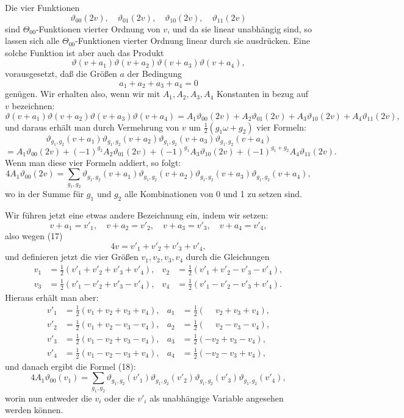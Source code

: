 \documentclass[11pt]{article}
\providecommand{\tht}{\vartheta}
\begin{document}
Die vier Funktionen
\begin{equation}
\tht_{00}(2v),\quad \tht_{01}(2v),\quad \tht_{10}(2v),\quad \tht_{11}(2v)
\tag{15}
\end{equation}
sind $\Theta_{00}$-Funktionen vierter Ordnung von $v$, und da sie linear unabhängig sind, so lassen sich alle $\Theta_{00}$-Funktionen vierter Ordnung linear durch sie ausdrücken. Eine solche Funktion ist aber auch das Produkt
\begin{equation}
\tht(v+a_1)\tht(v+a_2)\tht(v+a_3)\tht(v+a_4),
\tag{16}
\end{equation}
vorausgesetzt, daß die Größen $a$ der Bedingung
\begin{equation}
a_1+a_2+a_3+a_4=0
\tag{17}
\end{equation}
genügen. Wir erhalten also, wenn wir mit $A_1,A_2,A_3,A_4$ Konstanten in bezug auf $v$ bezeichnen:
\[
\tht(v+a_1)\tht(v+a_2)\tht(v+a_3)\tht(v+a_4)
=A_1\tht_{00}(2v)+A_2\tht_{01}(2v)+A_3\tht_{10}(2v)+A_4\tht_{11}(2v),
\]
und daraus erhält man durch Vermehrung von $v$ um $\frac12(g_1\omega+g_2)$ vier Formeln:
\[
\tht_{g_1,g_2}(v+a_1)\tht_{g_1,g_2}(v+a_2)\tht_{g_1,g_2}(v+a_3)\tht_{g_1,g_2}(v+a_4)
\]
\[
=A_1\tht_{00}(2v)+(-1)^{g_2}A_2\tht_{01}(2v)+(-1)^{g_1}A_3\tht_{10}(2v)+(-1)^{g_1+g_2}A_4\tht_{11}(2v).
\]
Wenn man diese vier Formeln addiert, so folgt:
\begin{equation}
4A_1\tht_{00}(2v)
=\sum_{g_1,g_2}\tht_{g_1,g_2}(v+a_1)\tht_{g_1,g_2}(v+a_2)
\tht_{g_1,g_2}(v+a_3)\tht_{g_1,g_2}(v+a_4),
\tag{18}
\end{equation}
wo in der Summe für $g_1$ und $g_2$ alle Kombinationen von 0 und 1 zu setzen sind.

Wir führen jetzt eine etwas andere Bezeichnung ein, indem wir setzen:
\[
v+a_1=v'_1,
\quad v+a_2=v'_2,
\quad v+a_3=v'_3,
\quad v+a_4=v'_4,
\]
also wegen (17)
\[
4v=v'_1+v'_2+v'_3+v'_4,
\]
und definieren jetzt die vier Größen $v_1,v_2,v_3,v_4$ durch die Gleichungen
\begin{equation}
\begin{aligned}
v_1&=\frac12(v'_1+v'_2+v'_3+v'_4),&
 v_2&=\frac12(v'_1+v'_2-v'_3-v'_4),\\
v_3&=\frac12(v'_1-v'_2+v'_3-v'_4),&
 v_4&=\frac12(v'_1-v'_2-v'_3+v'_4).
\end{aligned}
\tag{19}
\end{equation}
Hieraus erhält man aber:
\begin{equation}
\begin{aligned}
v'_1&=\tfrac12(v_1+v_2+v_3+v_4),& a_1&=\tfrac12(\phantom{-}v_2+v_3+v_4),\\
v'_2&=\tfrac12(v_1+v_2-v_3-v_4),& a_2&=\tfrac12(\phantom{-}v_2-v_3-v_4),\\
v'_3&=\tfrac12(v_1-v_2+v_3-v_4),& a_3&=\tfrac12(-v_2+v_3-v_4),\\
v'_4&=\tfrac12(v_1-v_2-v_3+v_4),& a_4&=\tfrac12(-v_2-v_3+v_4),
\end{aligned}
\tag{20}
\end{equation}
und danach ergibt die Formel (18):
\[
4A_1\tht_{00}(v_1)=\sum_{g_1,g_2}\tht_{g_1,g_2}(v'_1)\tht_{g_1,g_2}(v'_2)\tht_{g_1,g_2}(v'_3)\tht_{g_1,g_2}(v'_4),
\]
worin nun entweder die $v_i$ oder die $v'_i$ als unabhängige Variable angesehen werden können.
\end{document}
